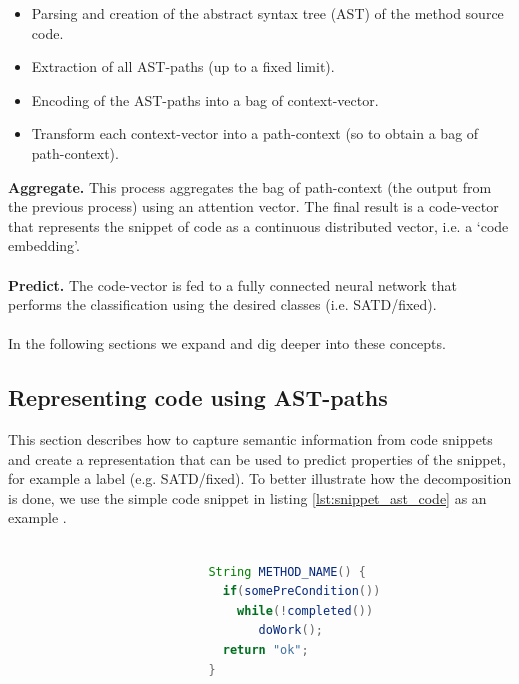 \begin{itemize}
    \item Parsing and creation of the abstract syntax tree (AST) of the method source code. 
    \item Extraction of all AST-paths (up to a fixed limit).
    \item Encoding of the AST-paths into a bag of context-vector.
    \item Transform each context-vector into a path-context (so to obtain a bag of path-context).
\end{itemize}

\noindent \textbf{Aggregate.} This process aggregates the bag of path-context (the output from the previous process) using an attention vector. The final result is a code-vector that represents the snippet of code as a continuous distributed vector, i.e. a `code embedding'.
\\
\\
\noindent \textbf{Predict.} The code-vector is fed to a fully connected neural network that performs the classification using the desired classes (i.e. SATD/fixed).
\\
\\
\noindent In the following sections we expand and dig deeper into these concepts.


\subsection{Representing code using AST-paths} \label{sec:code2vec_ast_paths}
This section describes how to capture semantic information from code snippets and create a representation that can be used to predict properties of the snippet, for example a label (e.g. SATD/fixed).
To better illustrate how the decomposition is done, we use the simple code snippet in listing \ref{lst:snippet_ast_code} as an example .

\begin{lstlisting}[caption={Example code to show decomposition}, label={lst:snippet_ast_code},language=Java]

                            String METHOD_NAME() {
                              if(somePreCondition())
                                while(!completed())
                                   doWork();
                              return "ok";
                            }
                            
\end{lstlisting}

